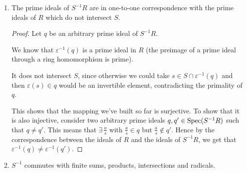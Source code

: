 \begin{exercise}
\begin{enumerate}
\begin{proof}
\begin{itemize}
        By the definition of equality in the localization, it means that \(\exists s \in S\) such that
        \[
            s(1x - 1a) = 0 \iff s x = s a
        \]
        But this simply shows that
        \[
            x \cdot (s) \subseteq (a) \subseteq \underline{a}
        \]
        hence \(x \in \underline{a} : (s)\) for some \(s \in S\).
        
        \item[\(\supseteq\)] Let \(y \in \underline{a} : (s)\) for some \(s \in S\). We want to show that \(y \in \varepsilon^{-1}(\underline{a} \, S^{-1} R)\). It's enough to check that
        \[
            \varepsilon(y) = \frac{y}{1} \in \underline{a} \, S^{-1} R
        \]
        
        By the definition of the colon ideal, \(y \cdot (s) \subseteq \underline{a}\). In particular, \(y s \in \underline{a}\). Hence
        \[
            \frac{y}{1} = \frac{ys}{s} \in \underline{a} \, S^{-1} R
        \]
        as desired.
    \end{itemize}
    \end{proof}
    
    \item The prime ideals of \(S^{-1} R\) are in one-to-one correspondence with the prime ideals of \(R\) which do not intersect \(S\).
    
    \begin{proof}
    Let \(q\) be an arbitrary prime ideal of \(S^{-1} R\).
    
    We know that \(\varepsilon^{-1}(q)\) is a prime ideal in \(R\) (the preimage of a prime ideal through a ring homomorphism is prime).
    
    It does not intersect \(S\), since otherwise we could take \(s \in S \cap \varepsilon^{-1}(q)\) and then \(\varepsilon(s) \in q\) would be an invertible element, contradicting the primality of \(q\). 
    
    This shows that the mapping we've built so far is surjective. To show that it is also injective, consider two arbitrary prime ideals \(q, q' \in \operatorname{Spec}(S^{-1} R)\) such that \(q \neq q'\). This means that \(\exists \, \frac{a}{s}\) with \(\frac{a}{s} \in q\) but \(\frac{a}{s} \not\in q'\). Hence by the correspondence between the ideals of \(R\) and the ideals of \(S^{-1} R\), we get that \(\varepsilon^{-1}(q) \neq \varepsilon^{-1}(q')\).
    \end{proof}
    
    \item \(S^{-1}\) commutes with finite sums, products, intersections and radicals.
    

\end{enumerate}
\end{exercise}
